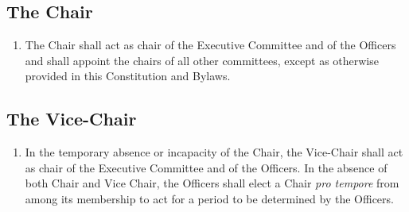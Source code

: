 \documentclass[12pt,letterpaper]{article}
\begin{document}
\subsection{The Chair}
\begin{enumerate}
	\item The Chair shall act as chair of the Executive Committee and of the
	      Officers and shall appoint the chairs of all other committees, except
				as otherwise provided in this Constitution and Bylaws.
\end{enumerate}

\subsection{The Vice-Chair}
\begin{enumerate}
	\item In the temporary absence or incapacity of the Chair, the Vice-Chair
	      shall act as chair of the Executive Committee and of the Officers.
				In the absence of both Chair and Vice Chair, the Officers shall elect
				a Chair \textit{pro tempore} from among its membership to act for a
				period to be determined by the Officers.
\end{enumerate}
\end{document}
